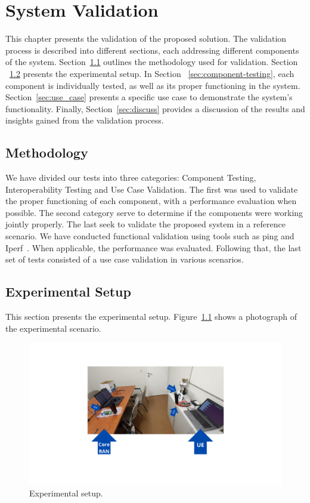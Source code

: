 \chapter{System Validation}\label{ch:validation}

This chapter presents the validation of the proposed solution.
The validation process is described into different sections, each addressing different components of the system.
Section~\ref{sec:meth} outlines the methodology used for validation.
Section ~\ref{sec:experimental-setup} presents the experimental setup.
In Section ~\ref{sec:component-testing}, each component is individually tested, as well as its proper functioning in the system.
Section~\ref{sec:use_case} presents a specific use case to demonstrate the system's functionality.
Finally, Section~\ref{sec:discuss} provides a discussion of the results and insights gained from the validation process.

\section{Methodology}\label{sec:meth}
We have divided our tests into three categories: Component Testing, Interoperability Testing and Use Case Validation.
The first was used to validate the proper functioning of each component, with a performance evaluation when possible.
The second category serve to determine if the components were working jointly properly.
The last seek to validate the proposed system in a reference scenario.
We have conducted functional validation using tools such as ping and Iperf~\cite{iperf}.
When applicable, the performance was evaluated.
Following that, the last set of tests consisted of a use case validation in various scenarios.

\section{Experimental Setup}\label{sec:experimental-setup}
This section presents the experimental setup.
Figure~\ref{fig:setup} shows a photograph of the experimental scenario.

\begin{figure}[H]
    \centering
    \includegraphics[width=\linewidth]{figures/setup}
    \caption{Experimental setup.}
    \label{fig:setup}
\end{figure}

